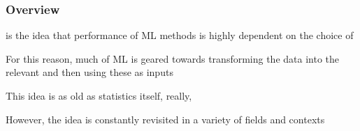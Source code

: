 \documentclass[12pt]{beamer}
\date{}
\begin{document}
\title{}
\subtitle{\classTitle}

\begin{frame}
\maketitle
%
\organization
%
\end{frame}



\begin{frame}[fragile]
\frametitle{Overview}
 is the idea that performance of ML methods is highly dependent on the choice
of 

\vsp
For this reason, much of ML is geared towards transforming the data into the relevant  and
then using these as inputs

\vsp
This idea is as old as statistics itself, really, 


\vsp
However, the idea is constantly revisited in a variety of fields and contexts
\end{frame}
%
%
%
%
\end{document}
